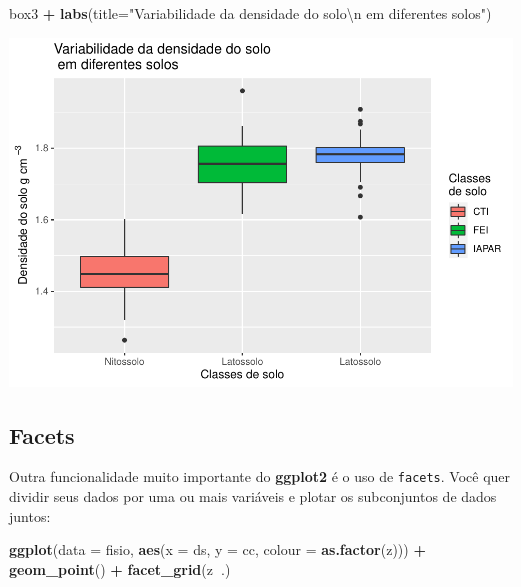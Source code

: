 \documentclass[
]{book}
\newenvironment{Shaded}{\begin{snugshade}}{\end{snugshade}}
\newcommand{\CharTok}[1]{\textcolor[rgb]{0.31,0.60,0.02}{#1}}
\newcommand{\DataTypeTok}[1]{\textcolor[rgb]{0.13,0.29,0.53}{#1}}
\newcommand{\KeywordTok}[1]{\textcolor[rgb]{0.13,0.29,0.53}{\textbf{#1}}}
\newcommand{\NormalTok}[1]{#1}
\newcommand{\OperatorTok}[1]{\textcolor[rgb]{0.81,0.36,0.00}{\textbf{#1}}}
\newcommand{\StringTok}[1]{\textcolor[rgb]{0.31,0.60,0.02}{#1}}
\begin{document}
\begin{Shaded}
\begin{Highlighting}[]
\NormalTok{box3 }\OperatorTok{+}\StringTok{ }\KeywordTok{labs}\NormalTok{(}\DataTypeTok{title=}\StringTok{"Variabilidade da densidade do solo}\CharTok{\textbackslash{}n}\StringTok{ em diferentes solos"}\NormalTok{)}
\end{Highlighting}
\end{Shaded}

\includegraphics{TudodoR_files/figure-latex/unnamed-chunk-219-2.pdf}

\hypertarget{facets}{%
\subsection{Facets}\label{facets}}

Outra funcionalidade muito importante do \textbf{ggplot2} é o uso de \texttt{facets}.
Você quer dividir seus dados por uma ou mais variáveis e plotar os subconjuntos de dados juntos:

\begin{Shaded}
\begin{Highlighting}[]
\KeywordTok{ggplot}\NormalTok{(}\DataTypeTok{data =}\NormalTok{ fisio, }\KeywordTok{aes}\NormalTok{(}\DataTypeTok{x =}\NormalTok{ ds, }\DataTypeTok{y =}\NormalTok{ cc, }\DataTypeTok{colour =} \KeywordTok{as.factor}\NormalTok{(z))) }\OperatorTok{+}
\StringTok{  }\KeywordTok{geom_point}\NormalTok{() }\OperatorTok{+}
\StringTok{  }\KeywordTok{facet_grid}\NormalTok{(z}\OperatorTok{~}\NormalTok{.)}
\end{Highlighting}
\end{Shaded}
\end{document}
